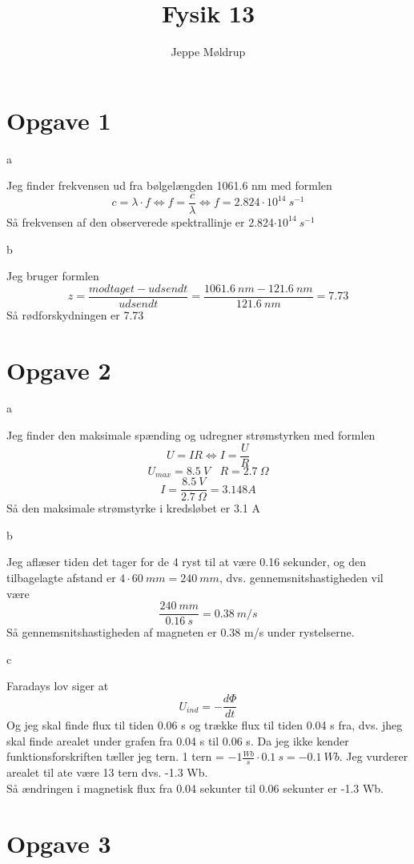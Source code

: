 \documentclass[12pt]{article}
\title{Fysik 13}
\author{Jeppe Møldrup}
\date{}
\begin{document}
\maketitle{}

\section*{Opgave 1}

a

Jeg finder frekvensen ud fra bølgelængden 1061.6 nm med formlen
$$c = \lambda \cdot f \Leftrightarrow f = \frac{c}{\lambda} \Leftrightarrow f = 2.824 \cdot 10^{14}\ s^{-1}$$
Så frekvensen af den observerede spektrallinje er 2.824$\cdot 10^{14}\ s^{-1}$

b

Jeg bruger formlen
$$z = \frac{modtaget-udsendt}{udsendt} = \frac{1061.6\ nm-121.6\ nm}{121.6\ nm} = 7.73$$
Så rødforskydningen er 7.73

\section*{Opgave 2}

a

Jeg finder den maksimale spænding og udregner strømstyrken med formlen
$$U=IR \Leftrightarrow I = \frac{U}{R}$$
$$U_{max} = 8.5\ V ~~~~ R = 2.7\ \Omega$$
$$I = \frac{8.5\ V}{2.7\ \Omega} = 3.148 A$$
Så den maksimale strømstyrke i kredsløbet er 3.1 A

b

Jeg aflæser tiden det tager for de 4 ryst til at være 0.16 sekunder, og den tilbagelagte afstand er $4\cdot 60\ mm=240\ mm$,
dvs. gennemsnitshastigheden vil være
$$\frac{240\ mm}{0.16\ s} = 0.38\ m/s$$
Så gennemsnitshastigheden af magneten er 0.38 m/s under rystelserne.

c

Faradays lov siger at
$$U_{ind} = -\frac{d\Phi}{dt}$$
Og jeg skal finde flux til tiden 0.06 s og trække flux til tiden 0.04 s fra, dvs. jheg skal finde arealet under grafen fra 0.04 s til 0.06 s.
Da jeg ikke kender funktionsforskriften tæller jeg tern. 1 tern = $-1\frac{Wb}{s}\cdot 0.1\ s = -0.1\ Wb$. Jeg vurderer arealet til ate være 13
tern dvs. -1.3 Wb.\\
Så ændringen i magnetisk flux fra 0.04 sekunter til 0.06 sekunter er -1.3 Wb.

\section*{Opgave 3}
\end{document}
